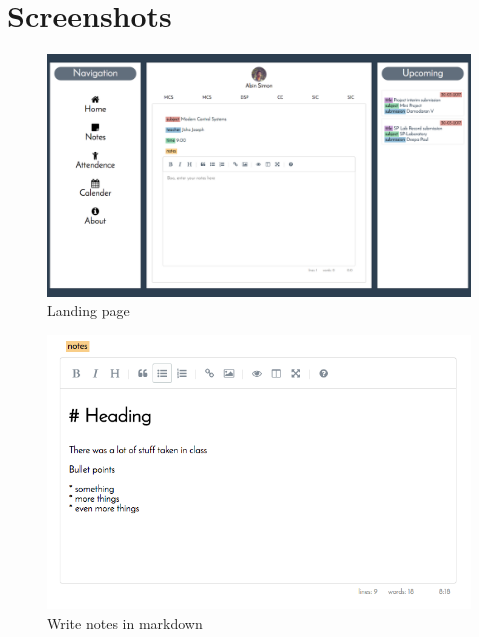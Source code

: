 \section{Screenshots}

\begin{figure}[htb]
    \centering
    \includegraphics[width=\linewidth]{landingpage.png}
    \caption{Landing page}
    \label{fig:landingpage} %
\end{figure}

\begin{figure}[htb]
    \centering
    \includegraphics[width=\linewidth]{notesmd.png}
    \caption{Write notes in markdown}
    \label{fig:notesmd} %
\end{figure}

